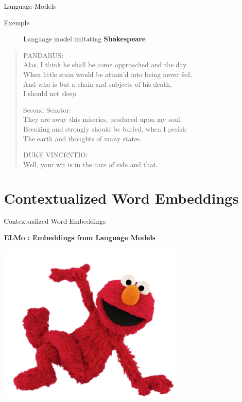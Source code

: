\documentclass[aspectratio=169]{beamer}
\begin{document}
\begin{frame}{Language Models}

\begin{description}
	\item [Exemple] Language model imitating \textbf{Shakespeare} \cite{karpathy2015unreasonable}
\end{description}

\begin{quote}
{\small
PANDARUS:\\
Alas, I think he shall be come approached and the day\\
When little srain would be attain'd into being never fed,\\
And who is but a chain and subjects of his death,\\
I should not sleep.\\ \vspace{.5cm}

Second Senator:\\
They are away this miseries, produced upon my soul,\\
Breaking and strongly should be buried, when I perish\\
The earth and thoughts of many states.\\ \vspace{.5cm}

DUKE VINCENTIO:\\
Well, your wit is in the care of side and that. }
\end{quote}

\end{frame}

\section{Contextualized Word Embeddings}

\begin{frame}{Contextualized Word Embeddings}

\centering
\textbf{ELMo : Embeddings from Language Models \cite{peters2018deep}}
\vspace{.3cm}

\includegraphics[width=0.7\textwidth]{figures/elmo}

\end{frame}
\end{document}

